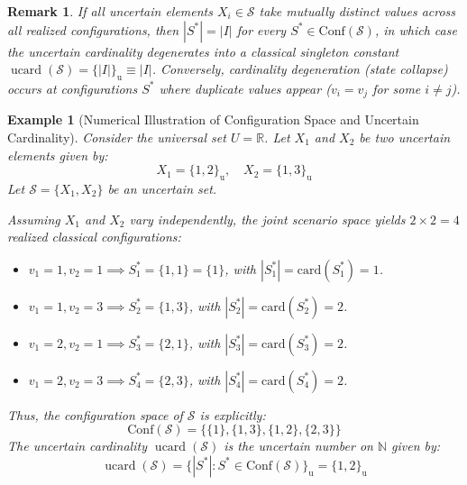 \documentclass[a4paper,12pt, twoside]{memoir}
\newtheorem{remark}{Remark}[chapter]
\newtheorem{example}{Example}[chapter]
\DeclareMathOperator{\UCARD}{ucard}
\newcommand{\tbd}[1]{\mathcal{#1}} %
\newcommand{\s}[1]{\{#1\}_\mathrm{u}} %
\begin{document}
	\begin{remark}
		If all uncertain elements $X_i \in \tbd{S}$ take mutually distinct values across all realized configurations, then $|S^*| = |I|$ for every $S^* \in \mathrm{Conf}(\tbd{S})$, in which case the uncertain cardinality degenerates into a classical singleton constant $\UCARD(\tbd{S}) = \s{|I|} \equiv |I|$. Conversely, cardinality degeneration (state collapse) occurs at configurations $S^*$ where duplicate values appear ($v_i = v_j$ for some $i \neq j$).
	\end{remark}
	
	\begin{example}[Numerical Illustration of Configuration Space and Uncertain Cardinality]
		Consider the universal set $U = \mathbb{R}$. Let $X_1$ and $X_2$ be two uncertain elements given by:
		\[
		X_1 = \s{1, 2}, \quad X_2 = \s{1, 3}
		\]
		Let $\tbd{S} = \{X_1, X_2\}$ be an uncertain set.
		
		Assuming $X_1$ and $X_2$ vary independently, the joint scenario space yields $2 \times 2 = 4$ realized classical configurations:
		\begin{itemize}[leftmargin=*]
			\item $v_1 = 1, v_2 = 1 \implies S_1^* = \{1, 1\} = \{1\}$, with $|S_1^*| = \mathrm{card}(S_1^*) = 1$.
			\item $v_1 = 1, v_2 = 3 \implies S_2^* = \{1, 3\}$, with $|S_2^*| = \mathrm{card}(S_2^*) = 2$.
			\item $v_1 = 2, v_2 = 1 \implies S_3^* = \{2, 1\}$, with $|S_3^*| = \mathrm{card}(S_3^*) = 2$.
			\item $v_1 = 2, v_2 = 3 \implies S_4^* = \{2, 3\}$, with $|S_4^*| = \mathrm{card}(S_4^*) = 2$.
		\end{itemize}
		
		Thus, the configuration space of $\tbd{S}$ is explicitly:
		\[
		\mathrm{Conf}(\tbd{S}) = \big\{ \{1\}, \{1, 3\}, \{1, 2\}, \{2, 3\} \big\}
		\]
		The uncertain cardinality $\UCARD(\tbd{S})$ is the uncertain number on $\mathbb{N}$ given by:
		\[
		\UCARD(\tbd{S}) = \s{ |S^*| : S^* \in \mathrm{Conf}(\tbd{S}) } = \s{1, 2}
		\]
	\end{example}
	
\end{document}
